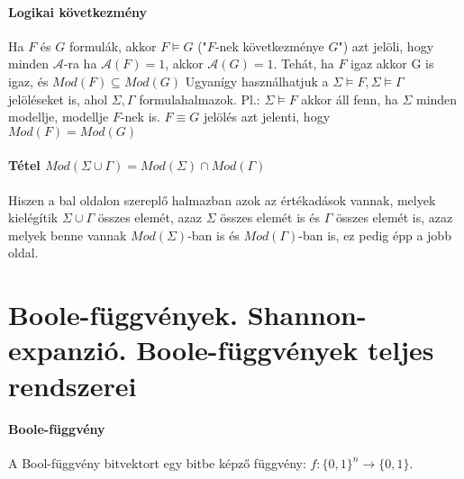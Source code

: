 \documentclass[10pt,a4paper]{article}
\begin{document}
\paragraph{Logikai következmény}
Ha $F$ és $G$ formulák, akkor $F \models G$ ("$F$-nek következménye $G$") azt jelöli, hogy minden $\mathcal{A}$-ra ha $\mathcal{A}(F)=1$, akkor $\mathcal{A}(G)=1$. Tehát, ha $F$ igaz akkor G is igaz, és $Mod(F) \subseteq Mod(G)$
Ugyanígy használhatjuk a $\Sigma \models F, \Sigma \models \Gamma$ jelöléseket is, ahol $\Sigma, \Gamma$ formulahalmazok. Pl.: $\Sigma \models F$ akkor áll fenn, ha $\Sigma$ minden modellje, modellje $F$-nek is. $F \equiv G$ jelölés azt jelenti, hogy $Mod(F) = Mod(G)$
\paragraph{Tétel $Mod(\Sigma \cup \Gamma) = Mod(\Sigma) \cap Mod(\Gamma)$}  Hiszen a bal oldalon szereplő halmazban azok az értékadások vannak, melyek kielégítik $\Sigma \cup \Gamma$ összes elemét, azaz $\Sigma$ összes elemét is és $\Gamma$ összes elemét is, azaz melyek benne vannak $Mod(\Sigma)$-ban is és  $Mod(\Gamma)$-ban is, ez pedig épp a jobb oldal.
\newpage
\section{Boole-függvények. Shannon-expanzió. Boole-függvények teljes rendszerei}
\paragraph{Boole-függvény}
A Bool-függvény bitvektort egy bitbe képző függvény: $f: \{0,1\}^{n} \rightarrow \{0,1\}.$
\end{document}
